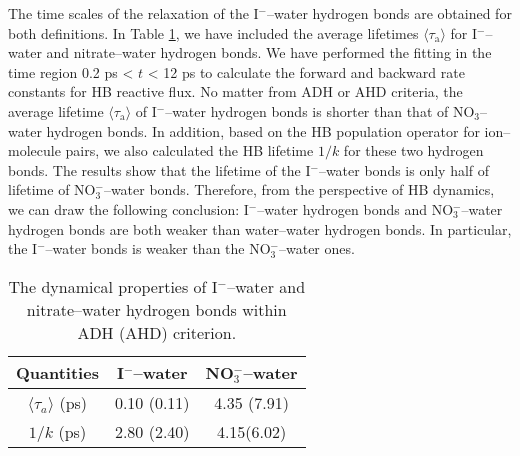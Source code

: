 The time scales of the relaxation of the I$^-$--water hydrogen bonds are obtained for both definitions. 
In Table \ref{tab:properties_anion-water_hbs}, we have included the average lifetimes $\langle\tau_\text{a}\rangle$ for I$^-$--water and nitrate--water hydrogen bonds. 
We have performed the fitting in the time region 0.2 ps < $t$ < 12 ps to calculate the forward and backward rate constants for HB reactive flux.
No matter from ADH or AHD criteria, the average lifetime $\langle\tau_\text{a}\rangle$ of I$^-$--water hydrogen bonds is shorter than that of NO$_3$--water hydrogen bonds.
In addition, based on the HB population operator for ion--molecule pairs, we also calculated the HB lifetime $1/k$ for these two hydrogen bonds. 
The results show that the lifetime of the I$^-$--water bonds is only half of lifetime of NO$_3^-$--water bonds. Therefore, from the perspective of HB dynamics,
we can draw the following conclusion: I$^-$--water hydrogen bonds and NO$_3^-$--water hydrogen bonds are both weaker than water--water hydrogen bonds. In particular, 
the I$^-$--water bonds is weaker than the NO$_3^-$--water ones.
\begin{table}[htbp]
\centering
\caption{ 
    The dynamical properties of I$^-$--water and nitrate--water hydrogen bonds within ADH (AHD) criterion.} 
\begin{tabular}{ccc}
\label{tab:properties_anion-water_hbs}
 Quantities  & I$^-$--water & NO$_3^-$--water \\
\hline
  $\langle\tau_a\rangle$ (ps) & 0.10 (0.11) & 4.35 (7.91) \\
  $1/k$ (ps) & 2.80 (2.40) & 4.15(6.02) \\
\end{tabular} %
\end{table}
%
%

